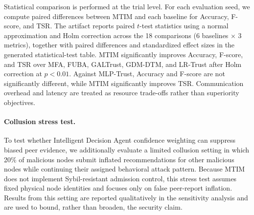 \documentclass[notspecified,article,submit,moreauthors]{Definitions/mdpi}
\begin{document}
Statistical comparison is performed at the trial level. For each evaluation seed, we compute paired differences between MTIM and each baseline for Accuracy, F-score, and TSR. The artifact reports paired $t$-test statistics using a normal approximation and Holm correction across the 18 comparisons (6 baselines $\times$ 3 metrics), together with paired differences and standardized effect sizes in the generated statistical-test table. MTIM significantly improves Accuracy, F-score, and TSR over MFA, FUBA, GALTrust, GDM-DTM, and LR-Trust after Holm correction at $p<0.01$. Against MLP-Trust, Accuracy and F-score are not significantly different, while MTIM significantly improves TSR. Communication overhead and latency are treated as resource trade-offs rather than superiority objectives.

\paragraph{Collusion stress test.}
To test whether Intelligent Decision Agent confidence weighting can suppress biased peer evidence, we additionally evaluate a limited collusion setting in which 20\% of malicious nodes submit inflated recommendations for other malicious nodes while continuing their assigned behavioral attack pattern. Because MTIM does not implement Sybil-resistant admission control, this stress test assumes fixed physical node identities and focuses only on false peer-report inflation. Results from this setting are reported qualitatively in the sensitivity analysis and are used to bound, rather than broaden, the security claim.
\end{document}
